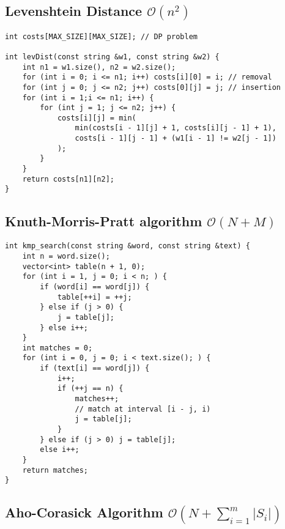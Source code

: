 \documentclass{article}
\begin{document}
\subsection{Levenshtein Distance $\mathcal{O}(n^{2})$}

\begin{lstlisting}
int costs[MAX_SIZE][MAX_SIZE]; // DP problem

int levDist(const string &w1, const string &w2) {
	int n1 = w1.size(), n2 = w2.size();
	for (int i = 0; i <= n1; i++) costs[i][0] = i; // removal
	for (int j = 0; j <= n2; j++) costs[0][j] = j; // insertion
	for (int i = 1;i <= n1; i++) {
		for (int j = 1; j <= n2; j++) {
			costs[i][j] = min(
				min(costs[i - 1][j] + 1, costs[i][j - 1] + 1),
				costs[i - 1][j - 1] + (w1[i - 1] != w2[j - 1])
			);
		}
	}
	return costs[n1][n2];
}
\end{lstlisting}

\subsection{Knuth-Morris-Pratt algorithm $\mathcal{O}(N + M)$}

\begin{lstlisting}
int kmp_search(const string &word, const string &text) {
	int n = word.size();
	vector<int> table(n + 1, 0);
	for (int i = 1, j = 0; i < n; ) {
		if (word[i] == word[j]) {
			table[++i] = ++j;
		} else if (j > 0) {
			j = table[j];
		} else i++;
	}
	int matches = 0;
	for (int i = 0, j = 0; i < text.size(); ) {
		if (text[i] == word[j]) {
			i++;
			if (++j == n) {
				matches++;
				// match at interval [i - j, i)
				j = table[j];
			}
		} else if (j > 0) j = table[j];
		else i++;
	}
	return matches;
}
\end{lstlisting}

\subsection{Aho-Corasick Algorithm $\mathcal{O}(N + \sum_{i=1}^{m} |S_i|)$}
\end{document}
